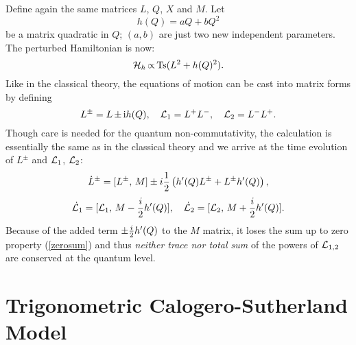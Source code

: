 \documentclass[a4paper,12pt]{article}
\begin{document}
Define again the same matrices $L$, $Q$, $X$ and $M$. Let
\begin{equation}
h(Q)=aQ+bQ^{2}
\end{equation}
be a matrix quadratic in $Q$; $(a,b)$ are just two new independent
parameters.
The perturbed Hamiltonian is now:
\begin{equation}
    {\cal H}_{h}\thinspace {\propto}
\thinspace \mbox{Ts}(L^{2}+h(Q)^{2}).
    \label{quartham}
\end{equation}
Like in the classical theory, the equations of motion can be cast into
matrix forms by defining
\begin{equation}
 L^{\pm}=L\, {\pm} \, {\rm i} h(Q),\quad
 {\cal L}_1=L^{+}L^{-},\quad {\cal L}_2=L^{-}L^{+}.
\end{equation}
Though care is needed for the quantum non-commutativity, the calculation is
essentially the same as in the classical theory and we arrive at
the time evolution of $L^\pm$ and ${\cal L}_1$,  ${\cal L}_2$:
\begin{equation}
\dot{L}^{\pm}=[L^{\pm},\, M] \pm
i{1\over2}\left(h'(Q)L^{\pm}+L^{\pm}h'(Q)\right),
\end{equation}
\begin{equation}
\dot{\cal L}_1=[{\cal L}_1,\, M-{i\over2}h'(Q)],\quad
\dot{\cal L}_2=[{\cal L}_2,\, M+{i\over2}h'(Q)].
\end{equation}
Because of the added term $\pm {i\over2}h'(Q)$ to the $M$ matrix,
it loses the sum up to zero property (\ref{zerosum}) and thus {\em neither
trace nor total sum} of the powers of ${\cal L}_{1,2}$ are conserved
at the quantum level.

\section{Trigonometric  Calogero-Sutherland
Model}
\label{trig}
\setcounter{equation}{0}
\end{document}
